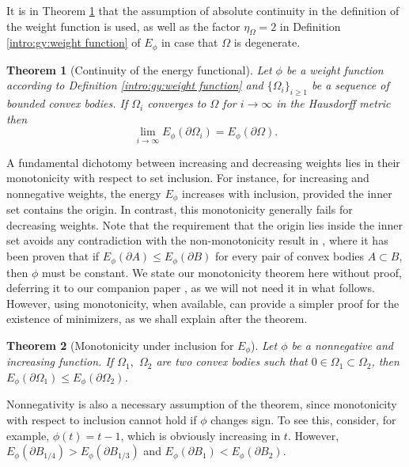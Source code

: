 \documentclass[10pt,leqno]{amsart}
\newcommand{\p}{\partial}
\newtheorem{Theorem}{Theorem}
\numberwithin{Theorem}{section}
\theoremstyle{definition}
\theoremstyle{remark}
\numberwithin{equation}{section}
\numberwithin{equation}{section}
\begin{document}
It is in Theorem \ref{lm:continuity_energy} that the assumption of absolute continuity in the definition of the weight function is used, as well as the factor $\eta_{\Omega}=2$ in Definition \ref{intro:gy:weight function} of $E_{\phi}$ in case that $\Omega$ is degenerate. 

\begin{Theorem}[Continuity of the energy functional]\label{lm:continuity_energy}
       Let $\phi$ be a weight function according to Definition \ref{intro:gy:weight function} and 
       $\{\Omega_i\}_{i \geq 1}$ be a sequence of bounded convex bodies. If $\Omega_i$ converges to $ \Omega$ for $i \to \infty$ in the Hausdorff metric then
       \[
       \lim_{i\to\infty} E_\phi(\p\Omega_i)= E_{\phi}( \p\Omega) .
       \]
\end{Theorem}



A fundamental dichotomy between increasing and decreasing weights lies in their monotonicity with respect to set inclusion. For instance, for increasing and nonnegative weights, the energy $E_\phi$ increases with inclusion, provided the inner set contains the origin. In contrast, this monotonicity generally fails for decreasing weights. Note that the requirement that the origin lies inside the inner set avoids any contradiction with the non-monotonicity result in \cite[Theorem 1.1]{saracco2024monotonicity}, where it has been proven that if  $E_\phi(\p A)\leq E_\phi(\p B)$ for every pair of convex bodies $A\subset B$, then $\phi$ must be constant. We state our monotonicity theorem here without proof, deferring it to our companion paper \cite{CG_part2}, as we will not need it in what follows. However, using monotonicity, when available, can provide a simpler proof for the existence of minimizers, as we shall explain after the theorem.

\begin{Theorem}[Monotonicity under inclusion for $E_\phi$] \label{l:monotonicity}
     Let $\phi$ be a  nonnegative and increasing function. If $\Omega_1,$ $\Omega_2$ are two convex bodies such that $0 \in \Omega_1 \subset \Omega_2$, then $E_\phi(\p \Omega_1) \le E_\phi(\p \Omega_2)$. 
\end{Theorem}

Nonnegativity is also a necessary assumption of the theorem, since monotonicity with respect to inclusion cannot hold if $\phi$ changes sign. To see this, consider, for example,
$\phi(t)=t-1$, which is obviously increasing in $t.$ However, $E_\phi(\p B_{1/4}) > E_\phi(\p B_{1/3})$ and $E_\phi(\p B_1) < E_\phi(\p B_2)$.
\end{document}
